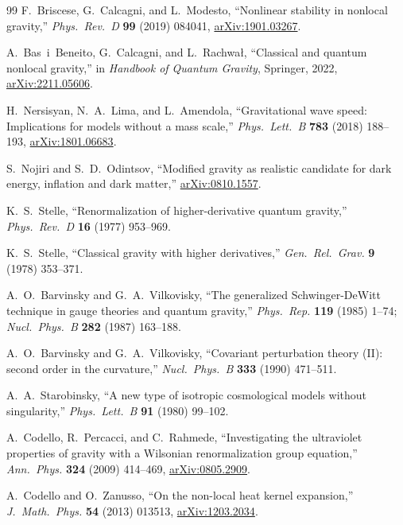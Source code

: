 \documentclass[12pt,a4paper]{article}
\theoremstyle{definition}
\theoremstyle{remark}
\begin{document}
\begin{thebibliography}{99}
F.~Briscese, G.~Calcagni, and L.~Modesto,
``Nonlinear stability in nonlocal gravity,''
\emph{Phys.\ Rev.\ D} \textbf{99} (2019) 084041,
\href{https://arxiv.org/abs/1901.03267}{arXiv:1901.03267}.

A.~Bas~i~Beneito, G.~Calcagni, and L.~Rachwa\l{},
``Classical and quantum nonlocal gravity,''
in \emph{Handbook of Quantum Gravity}, Springer, 2022,
\href{https://arxiv.org/abs/2211.05606}{arXiv:2211.05606}.

H.~Nersisyan, N.~A.~Lima, and L.~Amendola,
``Gravitational wave speed: Implications for models without a
mass scale,''
\emph{Phys.\ Lett.\ B} \textbf{783} (2018) 188--193,
\href{https://arxiv.org/abs/1801.06683}{arXiv:1801.06683}.

S.~Nojiri and S.~D.~Odintsov,
``Modified gravity as realistic candidate for dark energy, inflation
and dark matter,''
\href{https://arxiv.org/abs/0810.1557}{arXiv:0810.1557}.

K.~S.~Stelle,
``Renormalization of higher-derivative quantum gravity,''
\emph{Phys.\ Rev.\ D} \textbf{16} (1977) 953--969.

K.~S.~Stelle,
``Classical gravity with higher derivatives,''
\emph{Gen.\ Rel.\ Grav.} \textbf{9} (1978) 353--371.

A.~O.~Barvinsky and G.~A.~Vilkovisky,
``The generalized Schwinger-DeWitt technique in gauge theories and
quantum gravity,''
\emph{Phys.\ Rep.} \textbf{119} (1985) 1--74;
\emph{Nucl.\ Phys.\ B} \textbf{282} (1987) 163--188.

A.~O.~Barvinsky and G.~A.~Vilkovisky,
``Covariant perturbation theory (II): second order in the curvature,''
\emph{Nucl.\ Phys.\ B} \textbf{333} (1990) 471--511.

A.~A.~Starobinsky,
``A new type of isotropic cosmological models without singularity,''
\emph{Phys.\ Lett.\ B} \textbf{91} (1980) 99--102.

A.~Codello, R.~Percacci, and C.~Rahmede,
``Investigating the ultraviolet properties of gravity with a
Wilsonian renormalization group equation,''
\emph{Ann.\ Phys.} \textbf{324} (2009) 414--469,
\href{https://arxiv.org/abs/0805.2909}{arXiv:0805.2909}.

A.~Codello and O.~Zanusso,
``On the non-local heat kernel expansion,''
\emph{J.\ Math.\ Phys.} \textbf{54} (2013) 013513,
\href{https://arxiv.org/abs/1203.2034}{arXiv:1203.2034}.


\end{thebibliography}
\end{document}
